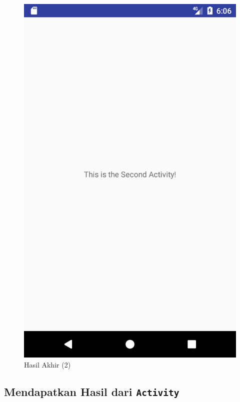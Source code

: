 \documentclass{scrartcl}
\begin{document}
\begin{enumerate}
\begin{figure}[htbp]
\begin{minipage}{.5\textwidth}
		\includegraphics[width=0.7\linewidth]{Screenshot_1496833588}
		\caption{Hasil Akhir (2)}
		\label{fig:screenshot_1496833588}
	\end{minipage}
	\end{figure}
	
\end{enumerate}

\subsection{Mendapatkan Hasil dari \texttt{Activity}}
\end{document}
